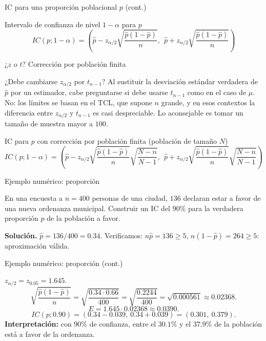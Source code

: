 \documentclass[aspectratio=169,11pt]{beamer}
\begin{document}
\begin{frame}{IC para una proporción poblacional $p$ (cont.)}
\begin{alertblock}{Intervalo de confianza de nivel $1-\alpha$ para $p$}
\[
IC(p;1-\alpha) = \left(\widehat p - z_{\alpha/2}\sqrt{\frac{\widehat p(1-\widehat p)}{n}},\ \ \widehat p + z_{\alpha/2}\sqrt{\frac{\widehat p(1-\widehat p)}{n}}\right)
\]
\end{alertblock}
\end{frame}

\begin{frame}{¿$z$ o $t$? Corrección por población finita}
\begin{block}{¿Debe cambiarse $z_{\alpha/2}$ por $t_{n-1}$?}
Al sustituir la desviación estándar verdadera de $\widehat p$ por un estimador, cabe preguntarse si debe usarse $t_{n-1}$ como en el caso de $\mu$. No: los límites se basan en el TCL, que supone $n$ grande, y en esos contextos la diferencia entre $z_{\alpha/2}$ y $t_{n-1}$ es casi despreciable. Lo aconsejable es tomar un tamaño de muestra mayor a $100$.
\end{block}

\begin{alertblock}{IC para $p$ con corrección por población finita (población de tamaño $N$)}
\[
IC(p;1-\alpha) = \left(\widehat p - z_{\alpha/2}\sqrt{\frac{\widehat p(1-\widehat p)}{n}}\sqrt{\frac{N-n}{N-1}},\ \ \widehat p + z_{\alpha/2}\sqrt{\frac{\widehat p(1-\widehat p)}{n}}\sqrt{\frac{N-n}{N-1}}\right)
\]
\end{alertblock}
\end{frame}

\begin{frame}{Ejemplo numérico: proporción}
\begin{example}
En una encuesta a $n=400$ personas de una ciudad, $136$ declaran estar a favor de una nueva ordenanza municipal. Construir un IC del $90\%$ para la verdadera proporción $p$ de la población a favor.

\textbf{Solución.} $\widehat p = 136/400 = 0.34$. Verificamos: $n\widehat p = 136 \ge 5$, $n(1-\widehat p)=264\ge 5$: aproximación válida.

\end{example}
\end{frame}

\begin{frame}{Ejemplo numérico: proporción (cont.)}
\begin{example}
$z_{\alpha/2}=z_{0.05}=1.645$.
\[
\sqrt{\frac{\widehat p(1-\widehat p)}{n}} = \sqrt{\frac{0.34\cdot 0.66}{400}} = \sqrt{\frac{0.2244}{400}} = \sqrt{0.000561} \approx 0.02368.
\]
\[
E = 1.645\cdot 0.02368 \approx 0.0390.
\]
\[
IC(p;0.90) = (0.34-0.039,\ 0.34+0.039) = (0.301,\ 0.379).
\]
\textbf{Interpretación:} con $90\%$ de confianza, entre el $30.1\%$ y el $37.9\%$ de la población está a favor de la ordenanza.
\end{example}
\end{frame}
\end{document}
